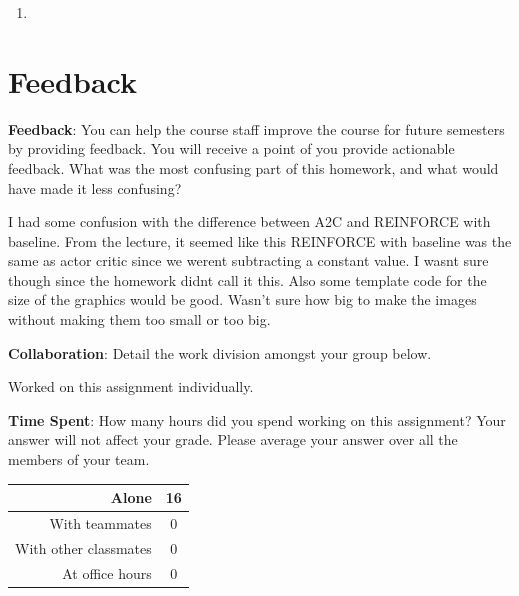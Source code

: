 \documentclass[12pt]{article}
\begin{document}
\begin{enumerate}
    \item \noindent\begin{solution}[height=5cm]
    \end{solution}
\end{enumerate}




\clearpage
\section*{Feedback}

\textbf{Feedback}: You can help the course staff improve the course for future semesters by providing feedback. You will receive a point of you provide actionable feedback. What was the most confusing part of this homework, and what would have made it less confusing?
\begin{solution}[height=4cm]
    I had some confusion with the difference between A2C and REINFORCE with baseline. From the lecture, it seemed like this REINFORCE with baseline was the same as actor critic since we werent subtracting a constant value. I wasnt sure though since the homework didnt call it this. Also some template code for the size of the graphics would be good. Wasn't sure how big to make the images without making them too small or too big.
\end{solution}

\textbf{Collaboration}: Detail the work division amongst your group below.
\begin{solution}[height=4cm]
    Worked on this assignment individually.
\end{solution}

\noindent\textbf{Time Spent}: How many hours did you spend working on this assignment? Your answer will not affect your grade. Please average your answer over all the members of your team.
\begin{solution}[height=4cm]
\begin{table}[H]
    \centering
    \begin{tabular}{r|c}
        Alone &  \hspace{3em} 16 %
        \\ \hline
        With teammates & \hspace{3em} 0  %
        \\ \hline
        With other classmates & \hspace{3em} 0 %
        \\ \hline
        At office hours & \hspace{3em} 0 %
        \\ \hline
    \end{tabular}
\end{table}
\end{solution}
\end{document}
